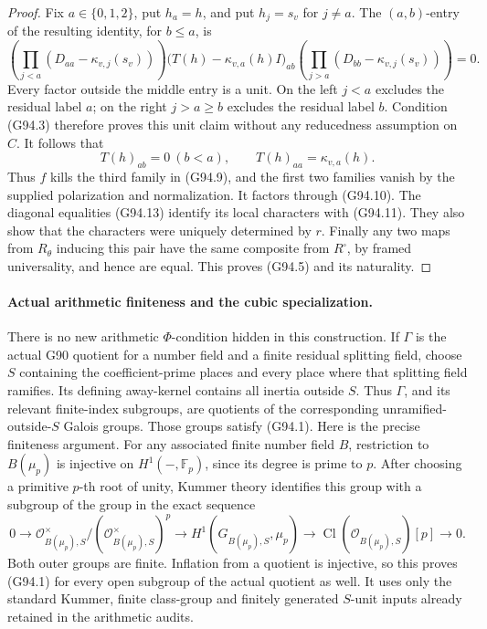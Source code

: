 \begin{proof}
Fix \(a\in\{0,1,2\}\), put \(h_a=h\), and put
\(h_j=s_v\) for \(j\ne a\).
The \((a,b)\)-entry of the resulting identity, for
\(b\leq a\), is
\[
 \left(\prod_{j<a}(D_{aa}-\kappa_{v,j}(s_v))\right)
 \bigl(T(h)-\kappa_{v,a}(h)I\bigr)_{ab}
 \left(\prod_{j>a}(D_{bb}-\kappa_{v,j}(s_v))\right)=0.
 \tag{G94.12}
\]
Every factor outside the middle entry is a unit.
On the left \(j<a\) excludes the residual label \(a\);
on the right \(j>a\geq b\) excludes the residual label
\(b\).  Condition (G94.3) therefore proves this unit claim
without any reducedness assumption on \(C\).
It follows that
\[
 T(h)_{ab}=0\ (b<a),\qquad
 T(h)_{aa}=\kappa_{v,a}(h).
 \tag{G94.13}
\]
Thus \(f\) kills the third family in (G94.9), and the
first two families vanish by the supplied polarization
and normalization.  It factors through (G94.10).
The diagonal equalities (G94.13) identify its local
characters with (G94.11).  They also show that the
characters were uniquely determined by \(r\).
Finally any two maps from \(R_{\theta}\) inducing this
pair have the same composite from \(R^{\square}\), by
framed universality, and hence are equal.  This proves
(G94.5) and its naturality.
\end{proof}

\paragraph{Actual arithmetic finiteness and the cubic specialization.}
There is no new arithmetic \(\Phi\)-condition hidden in this
construction.  If \(\Gamma\) is the actual G90 quotient for
a number field and a finite residual splitting field, choose
\(S\) containing the coefficient-prime places and every place
where that splitting field ramifies.  Its defining away-kernel
contains all inertia outside \(S\).  Thus \(\Gamma\), and
its relevant finite-index subgroups, are quotients of the
corresponding unramified-outside-\(S\) Galois groups.
Those groups satisfy (G94.1).  Here is the precise finiteness
argument.  For any associated finite number field \(B\),
restriction to \(B(\mu_p)\) is injective on
\(H^1(-,\mathbb F_p)\), since its degree is prime to \(p\).
After choosing a primitive \(p\)-th root of unity, Kummer
theory identifies this group with a subgroup of the group
in the exact sequence
\[
 0\longrightarrow
 \mathcal O_{B(\mu_p),S}^{\times}/
       (\mathcal O_{B(\mu_p),S}^{\times})^p
 \longrightarrow H^1(G_{B(\mu_p),S},\mu_p)
 \longrightarrow\operatorname{Cl}(\mathcal O_{B(\mu_p),S})[p]
 \longrightarrow0.
 \tag{G94.14}
\]
Both outer groups are finite.  Inflation from a quotient
is injective, so this proves (G94.1) for every open subgroup
of the actual quotient as well.  It uses only the standard
Kummer, finite class-group and finitely generated \(S\)-unit
inputs already retained in the arithmetic audits.

